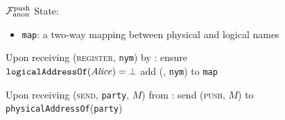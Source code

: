   \begin{figure}[H]
    \begin{systembox}{$\mathcal{F}_{\mathrm{anon}}^{\mathrm{push}}$}
      State:
      \begin{itemize}
        \item \texttt{map}: a two-way mapping between physical and logical names
      \end{itemize}
      \begin{algorithmic}[1]
        \State Upon receiving (\textsc{register}, \texttt{nym}) by \alice:
        \Indent
          \State ensure $\mathtt{logicalAddressOf}(\mathit{Alice}) = \bot$
          \State add (\alice, \texttt{nym}) to \texttt{map}
        \EndIndent
        \Statex

        \State Upon receiving (\textsc{send}, \texttt{party}, $M$) from \alice:
        \Indent
          \State send (\textsc{push}, $M$) to
          \texttt{physicalAddressOf}(\texttt{party}) 
        \EndIndent
        \Statex
      \end{algorithmic}
    \end{systembox}
    \caption{}
    \label{alg:anonfunc:push}
  \end{figure}
